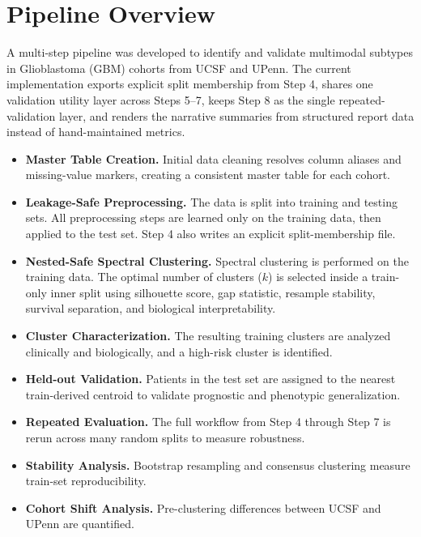 \documentclass[11pt]{article}
\begin{document}
\section*{Pipeline Overview}
A multi-step pipeline was developed to identify and validate multimodal subtypes in Glioblastoma (GBM) cohorts from UCSF and UPenn. The current implementation exports explicit split membership from Step 4, shares one validation utility layer across Steps 5--7, keeps Step 8 as the single repeated-validation layer, and renders the narrative summaries from structured report data instead of hand-maintained metrics.

\begin{itemize}
    \item[\textbf{Step 3:}] \textbf{Master Table Creation.} Initial data cleaning resolves column aliases and missing-value markers, creating a consistent master table for each cohort.
    \item[\textbf{Step 4:}] \textbf{Leakage-Safe Preprocessing.} The data is split into training and testing sets. All preprocessing steps are learned only on the training data, then applied to the test set. Step 4 also writes an explicit split-membership file.
    \item[\textbf{Step 5:}] \textbf{Nested-Safe Spectral Clustering.} Spectral clustering is performed on the training data. The optimal number of clusters ($k$) is selected inside a train-only inner split using silhouette score, gap statistic, resample stability, survival separation, and biological interpretability.
    \item[\textbf{Step 6:}] \textbf{Cluster Characterization.} The resulting training clusters are analyzed clinically and biologically, and a high-risk cluster is identified.
    \item[\textbf{Step 7:}] \textbf{Held-out Validation.} Patients in the test set are assigned to the nearest train-derived centroid to validate prognostic and phenotypic generalization.
    \item[\textbf{Step 8:}] \textbf{Repeated Evaluation.} The full workflow from Step 4 through Step 7 is rerun across many random splits to measure robustness.
    \item[\textbf{Step 9:}] \textbf{Stability Analysis.} Bootstrap resampling and consensus clustering measure train-set reproducibility.
    \item[\textbf{Step 11:}] \textbf{Cohort Shift Analysis.} Pre-clustering differences between UCSF and UPenn are quantified.
\end{itemize}
\end{document}
